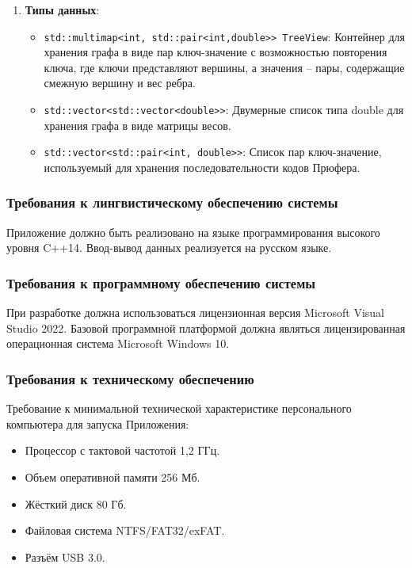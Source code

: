 \documentclass[12pt,a4paper]{article}
\begin{document}
\begin{enumerate}
    \item \textbf{Типы данных}:
        \begin{itemize}
            \item \texttt{std::multimap<int, std::pair<int,double{>}{>} TreeView}: Контейнер для хранения графа в
            виде пар ключ-значение с возможностью повторения ключа, где ключи представляют вершины, 
            а значения -- пары, содержащие смежную вершину и вес ребра.
            \item \texttt{std::vector<std::vector<double{>}{>}}: Двумерные список типа double для хранения графа в
            виде матрицы весов.
            \item \texttt{std::vector<std::pair<int, double{>}{>}}: Список пар ключ-значение, используемый
            для хранения последовательности кодов Прюфера.
        \end{itemize}
\end{enumerate}

\subsubsection{Требования к лингвистическому обеспечению системы}
Приложение должно быть реализовано на языке программирования высокого уровня C++14.\medskip \newline
Ввод-вывод данных реализуется на русском языке.

\subsubsection{Требования к программному обеспечению системы}
При разработке должна использоваться лицензионная версия Microsoft Visual Studio 2022.\medskip \newline
Базовой программной платформой должна являться лицензированная операционная система Microsoft Windows 10. 

\subsubsection{Требования к техническому обеспечению}\label{comp}
Требование к минимальной технической характеристике персонального компьютера для запуска Приложения:
\begin{itemize}
    \item Процессор с тактовой частотой 1,2 ГГц.
    \item Объем оперативной памяти 256 Мб.
    \item Жёсткий диск 80 Гб.
    \item Файловая система NTFS/FAT32/exFAT.
    \item Разъём USB 3.0.
\end{itemize}
\end{document}
